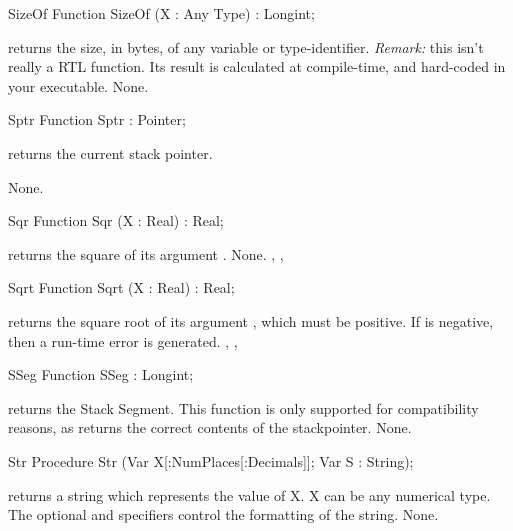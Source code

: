 \documentclass{report}
\begin{document}

\begin{function}{SizeOf}
\Declaration
Function SizeOf (X : Any Type) : Longint;

\Description
{} returns the size, in bytes, of any variable or type-identifier.
 {\em Remark:} this isn't really a RTL function. Its result is calculated at
compile-time, and hard-coded in your executable.
\Errors
None.
\SeeAlso
{}
\end{function}


\begin{function}{Sptr}
\Declaration
Function Sptr  : Pointer;

\Description
{} returns the current stack pointer.

\Errors
None.
\SeeAlso
{}
\end{function}


\begin{function}{Sqr}
\Declaration
Function Sqr (X : Real) : Real;

\Description
{} returns the square of its argument .
\Errors
None.
\SeeAlso
{}, , 
\end{function}


\begin{function}{Sqrt}
\Declaration
Function Sqrt (X : Real) : Real;

\Description
{} returns the square root of its argument , which must be
positive.
\Errors
If  is negative, then a run-time error is generated.
\SeeAlso
{}, , 
\end{function}


\begin{function}{SSeg}
\Declaration
Function SSeg  : Longint;

\Description
  returns the Stack Segment. This function is only
 supported for compatibility reasons, as  returns the
correct contents of the stackpointer.
\Errors
None.
\SeeAlso
{}
\end{function}


\begin{procedure}{Str}
\Declaration
Procedure Str (Var X[:NumPlaces[:Decimals]]; Var S : String);

\Description
{} returns a string which represents the value of X. X can be any
numerical type.
The optional  and  specifiers control the
formatting of the string.
\Errors
None.
\SeeAlso
{}
\end{procedure}
\end{document}
